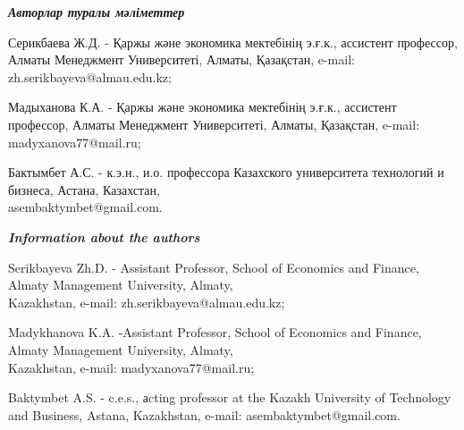 \begin{authorinfo}
\hspace{1em}\emph{{\bfseries Авторлар туралы мәліметтер}}

Серикбаева Ж.Д. - Қаржы және экономика мектебінің э.ғ.к., ассистент
профессор, Алматы Менеджмент Университеті, Алматы, Қазақстан, e-mail:
zh.serikbayeva@almau.edu.kz;

Мадыханова К.А. - Қаржы және экономика мектебінің э.ғ.к., ассистент
профессор, Алматы Менеджмент Университеті, Алматы, Қазақстан, e-mail:
madyxanova77@mail.ru;

Бактымбет А.С. - к.э.н., и.о. профессора Казахского университета
технологий и бизнеса, Астана, Казахстан,\\
asembaktymbet@gmail.com.

\hspace{1em}\emph{{\bfseries Information about the authors}}

Serikbayeva Zh.D. - Assistant Professor, School of Economics and
Finance, Almaty Management University, Almaty, \\Kazakhstan, e-mail:
zh.serikbayeva@almau.edu.kz;

Madykhanova K.A. -Assistant Professor, School of Economics and Finance,
Almaty Management University, Almaty, \\Kazakhstan, e-mail:
madyxanova77@mail.ru;

Baktymbet A.S. - c.e.s., аcting professor at the Kazakh University of
Technology and Business, Astana, Kazakhstan, e-mail:
asembaktymbet@gmail.com.
\end{authorinfo}
